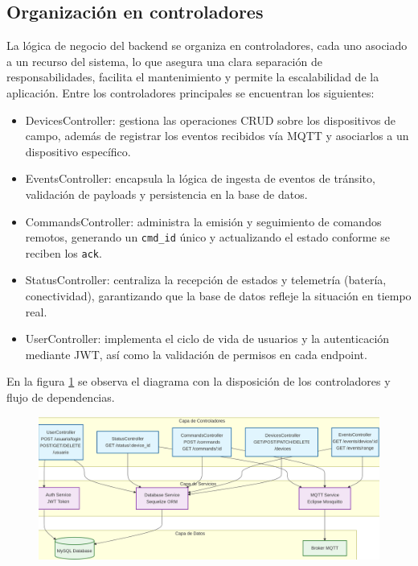 \subsection{Organización en controladores}

La lógica de negocio del backend se organiza en controladores, cada uno asociado a un recurso del sistema, lo que asegura una clara separación de responsabilidades, facilita el mantenimiento y permite la escalabilidad de la aplicación. Entre los controladores principales se encuentran los siguientes:

\begin{itemize}
  \item DevicesController: gestiona las operaciones CRUD sobre los dispositivos de campo, además de registrar los eventos recibidos vía MQTT y asociarlos a un dispositivo específico.
  \item EventsController: encapsula la lógica de ingesta de eventos de tránsito, validación de payloads y persistencia en la base de datos.
  \item CommandsController: administra la emisión y seguimiento de comandos remotos, generando un \texttt{cmd\_id} único y actualizando el estado conforme se reciben los \texttt{ack}.
  \item StatusController: centraliza la recepción de estados y telemetría (batería, conectividad), garantizando que la base de datos refleje la situación en tiempo real.
  \item UserController: implementa el ciclo de vida de usuarios y la autenticación mediante JWT, así como la validación de permisos en cada endpoint.
\end{itemize}

En la figura \ref{fig:diagrama_controladores} se observa el diagrama con la disposición de los controladores y flujo de dependencias.

\begin{figure}[H]
 
  \centering
  \includegraphics[scale=0.11]{./Figures/diagDispoControlladores.png}
  \label{fig:diagrama_controladores}
  \end{figure}



